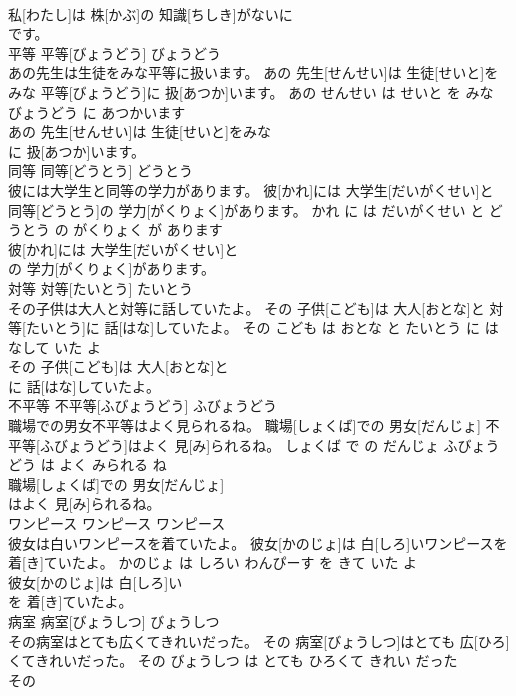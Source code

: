 \documentclass[8pt]{extreport}
\begin{document}
\begin{CJK}{UTF8}{min}
\\	私[わたし]は 株[かぶ]の 知識[ちしき]がないに
\\	です。			
\\	平等	平等[びょうどう]	びょうどう	
\\	あの先生は生徒をみな平等に扱います。	あの 先生[せんせい]は 生徒[せいと]をみな 平等[びょうどう]に 扱[あつか]います。	あの せんせい は せいと を みな びょうどう に あつかいます	
\\	あの 先生[せんせい]は 生徒[せいと]をみな
\\	に 扱[あつか]います。			
\\	同等	同等[どうとう]	どうとう	
\\	彼には大学生と同等の学力があります。	彼[かれ]には 大学生[だいがくせい]と 同等[どうとう]の 学力[がくりょく]があります。	かれ に は だいがくせい と どうとう の がくりょく が あります	
\\	彼[かれ]には 大学生[だいがくせい]と
\\	の 学力[がくりょく]があります。			
\\	対等	対等[たいとう]	たいとう	
\\	その子供は大人と対等に話していたよ。	その 子供[こども]は 大人[おとな]と 対等[たいとう]に 話[はな]していたよ。	その こども は おとな と たいとう に はなして いた よ	
\\	その 子供[こども]は 大人[おとな]と
\\	に 話[はな]していたよ。			
\\	不平等	不平等[ふびょうどう]	ふびょうどう	
\\	職場での男女不平等はよく見られるね。	職場[しょくば]での 男女[だんじょ] 不平等[ふびょうどう]はよく 見[み]られるね。	しょくば で の だんじょ ふびょうどう は よく みられる ね	
\\	職場[しょくば]での 男女[だんじょ]
\\	はよく 見[み]られるね。			
\\	ワンピース	ワンピース	ワンピース	
\\	彼女は白いワンピースを着ていたよ。	彼女[かのじょ]は 白[しろ]いワンピースを 着[き]ていたよ。	かのじょ は しろい わんぴーす を きて いた よ	
\\	彼女[かのじょ]は 白[しろ]い
\\	を 着[き]ていたよ。			
\\	病室	病室[びょうしつ]	びょうしつ	
\\	その病室はとても広くてきれいだった。	その 病室[びょうしつ]はとても 広[ひろ]くてきれいだった。	その びょうしつ は とても ひろくて きれい だった	
\\	その

\end{CJK}
\end{document}
